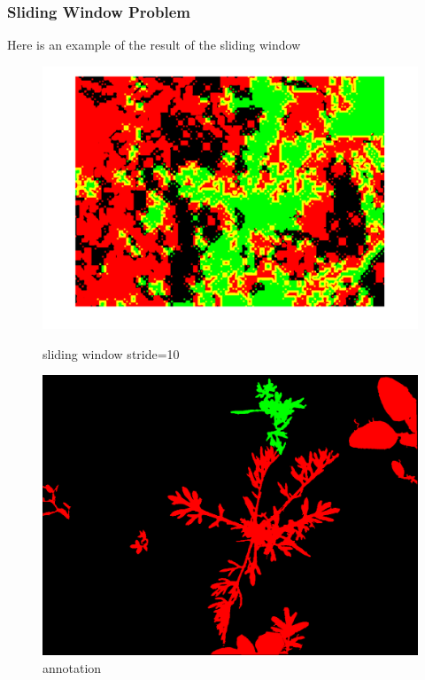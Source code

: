 \documentclass{beamer}
\begin{document}
\begin{frame}
\frametitle{Sliding Window Problem}

Here is an example of the result of the sliding window
\begin{figure}[!htb]
  \includegraphics[width=\linewidth]{stride10im1.png}
  \caption{sliding window stride=10}\label{fig: sliding window problem}
\endminipage\hfill
{}
  \includegraphics[width=\linewidth]{annotation.png}
  \caption{annotation}\label{fig:annotation}
\endminipage\hfill
\end{figure}
\newpage

\end{frame}
\end{document}
